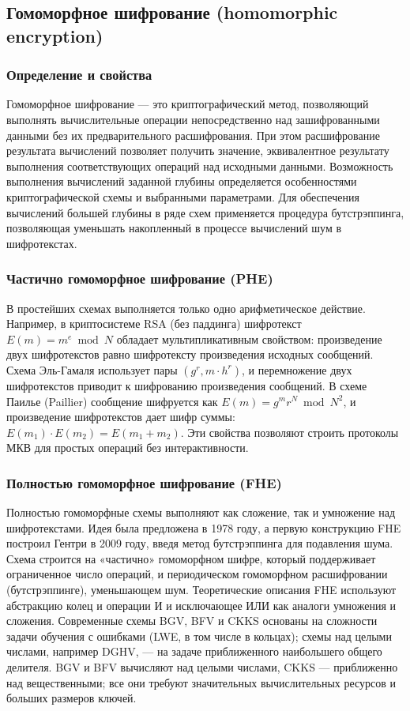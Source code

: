 \subsection{Гомоморфное шифрование (homomorphic encryption)}

\subsubsection{Определение и свойства}

Гомоморфное шифрование --- это криптографический метод, позволяющий выполнять вычислительные операции непосредственно над зашифрованными данными без их предварительного расшифрования. При этом расшифрование результата вычислений позволяет получить значение, эквивалентное результату выполнения соответствующих операций над исходными данными. Возможность выполнения вычислений заданной глубины определяется особенностями криптографической схемы и выбранными параметрами. Для обеспечения вычислений большей глубины в ряде схем применяется процедура бутстрэппинга, позволяющая уменьшать накопленный в процессе вычислений шум в шифротекстах.

\subsubsection{Частично гомоморфное шифрование (PHE)}

В простейших схемах выполняется только одно арифметическое действие.  Например, в криптосистеме RSA (без паддинга) шифротекст \(E(m) = m^e \bmod N\) обладает мультипликативным свойством: произведение двух шифротекстов равно шифротексту произведения исходных сообщений.  Схема Эль-Гамаля использует пары \((g^r, m \cdot h^r)\), и перемножение двух шифротекстов приводит к шифрованию произведения сообщений.  В схеме Паилье (Paillier) сообщение шифруется как \(E(m) = g^m r^N \bmod N^2\), и произведение шифротекстов дает шифр суммы: \(E(m_1)\cdot E(m_2) = E(m_1 + m_2)\).  Эти свойства позволяют строить протоколы МКВ для простых операций без интерактивности.

\subsubsection{Полностью гомоморфное шифрование (FHE)}

Полностью гомоморфные схемы выполняют как сложение, так и умножение над шифротекстами.  Идея была предложена в 1978 году, а первую конструкцию FHE построил Гентри в 2009 году, введя метод бутстрэппинга для подавления шума.  Схема строится на «частично» гомоморфном шифре, который поддерживает ограниченное число операций, и периодическом гомоморфном расшифровании (бутстрэппинге), уменьшающем шум.  Теоретические описания FHE используют абстракцию колец и операции И и исключающее ИЛИ как аналоги умножения и сложения.  Современные схемы BGV, BFV и CKKS основаны на сложности задачи обучения с ошибками (LWE, в том числе в кольцах); схемы над целыми числами, например DGHV, --- на задаче приближенного наибольшего общего делителя.  BGV и BFV вычисляют над целыми числами, CKKS --- приближенно над вещественными; все они требуют значительных вычислительных ресурсов и больших размеров ключей.

